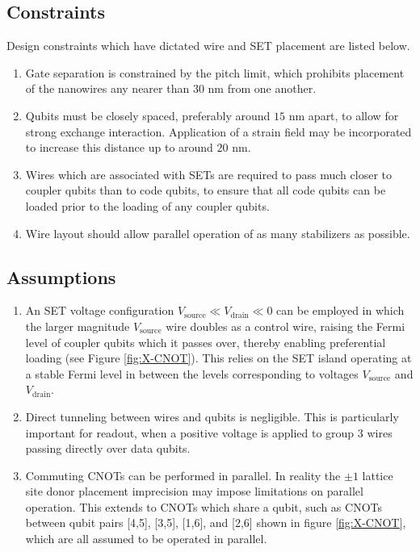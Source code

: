 \documentclass[../Thesis.tex]{subfiles}
\begin{document}
\subsection{Constraints}
Design constraints which have dictated wire and SET placement are listed below. 
\begin{enumerate}
    \item Gate separation is constrained by the pitch limit, which prohibits placement of the nanowires any nearer than 30 nm from one another.
    \item Qubits must be closely spaced, preferably around $15$ nm apart, to allow for strong exchange interaction. Application of a strain field\cite{hill_exchange-based_2021} may be incorporated to increase this distance up to around $20$ nm.
    \item Wires which are associated with SETs are required to pass much closer to coupler qubits than to code qubits, to ensure that all code qubits can be loaded prior to the loading of any coupler qubits.
    \item Wire layout should allow parallel operation of as many stabilizers as possible. 
\end{enumerate}

\subsection{Assumptions}
\begin{enumerate}
    \item An SET voltage configuration $V_{\text{source}} \ll V_{\text{drain}}\ll 0$ can be employed in which the larger magnitude $V_{\text{source}}$ wire doubles as a control wire, raising the Fermi level of coupler qubits which it passes over, thereby enabling preferential loading (see Figure \ref{fig:X-CNOT}). This relies on the SET island operating at a stable Fermi level in between the levels corresponding to voltages $V_{\text{source}}$ and $V_{\text{drain}}$. 
    
    \item Direct tunneling between wires and qubits is negligible. This is particularly important for readout, when a positive voltage is applied to group 3 wires passing directly over data qubits.
    \item Commuting CNOTs can be performed in parallel. In reality the $\pm 1$ lattice site donor placement imprecision may impose  limitations on parallel operation. This extends to CNOTs which share a qubit, such as CNOTs between qubit pairs [4,5], [3,5], [1,6], and [2,6] shown in figure \ref{fig:X-CNOT}, which are all assumed to be operated in parallel.
\end{enumerate}
\end{document}
